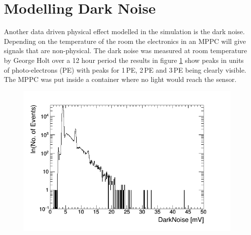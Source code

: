 \section{Modelling Dark Noise}\label{sec:geant4Simulation_ModellingDarkNoise}
Another data driven physical effect modelled in the simulation is the dark noise. Depending on the temperature of the room the electronics in an MPPC will give signals that are non-physical. The dark noise was measured at room temperature by George Holt over a 12 hour period the results in figure \ref{fig:pureDarkNoise} show peaks in units of photo-electrons (PE) with peaks for 1\,PE, 2\,PE and 3\,PE being clearly visible. The MPPC was put inside a container where no light would reach the sensor. 
\begin{figure}[H]
 \centering
 \includegraphics[width=0.8\linewidth]{pureDarkNoise_output.png}
 \label{fig:pureDarkNoise}
\end{figure}

